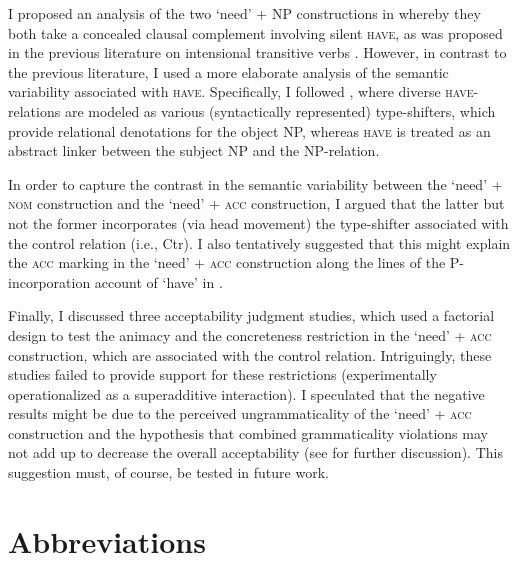 \documentclass[output=paper]{langscibook}
\begin{document}
I proposed an analysis of the two `need' + NP constructions in  whereby they both take a concealed clausal complement involving silent \textsc{have}, as was proposed in the previous literature on intensional transitive verbs \citep[e.g.,][]{Harves2008}. However, in contrast to the previous literature, I used a more elaborate analysis of the semantic variability associated with \textsc{have}. Specifically, I followed \citet{Zaroukian.Beller2013}, where diverse \textsc{have}-relations are modeled as various (syntactically represented) type-shifters, which provide relational denotations for the object NP, whereas \textsc{have} is treated as an abstract linker between the subject NP and the NP-relation.

In order to capture the contrast in the semantic variability between the `need' + \textsc{nom} construction and the `need' + \textsc{acc} construction, I argued that the latter but not the former incorporates (via head movement) the type-shifter associated with the control relation (i.e., Ctr). I also tentatively suggested that this might explain the \textsc{acc} marking in the `need' + \textsc{acc} construction along the lines of the P-incorporation account of `have' in \citet{Freeze1992} \citep[see also][]{Kayne1993}.

    \largerpage %

Finally, I discussed three acceptability judgment studies, which used a factorial design to test the animacy and the concreteness restriction in the `need' + \textsc{acc} construction, which are associated with the control relation. Intriguingly, these studies failed to provide support for these restrictions (experimentally operationalized as a superadditive interaction). I speculated that the negative results might be due to the perceived ungrammaticality of the `need' + \textsc{acc} construction and the hypothesis that combined grammaticality violations may not add up to decrease the overall acceptability (see \citealt{Hofmeister.Casasanto.Staum.Sag2014} for further discussion). This suggestion must, of course, be tested in future work.

\section*{Abbreviations}
\end{document}
